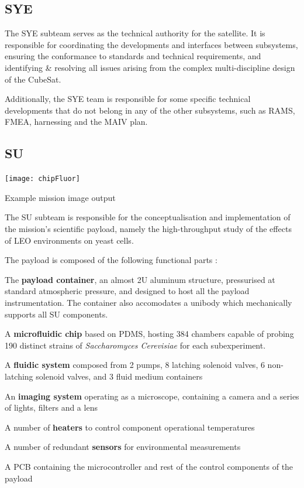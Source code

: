 \documentclass[a4paper,nobib]{tufte-book}
\begin{document}
\subsection{\acf{SYE}}

The \acl{SYE} subteam serves as the technical authority for the satellite. It is responsible for coordinating the developments and interfaces between subsystems, ensuring the conformance to standards and technical requirements, and identifying \& resolving all issues arising from the complex multi-discipline design of the CubeSat.

Additionally, the \ac{SYE} team is responsible for some specific technical developments that do not belong in any of the other subsystems, such as \ac{RAMS}, \ac{FMEA}, harnessing and the \acl{MAIV} plan.

\subsection{\acf{SU}}
\begin{marginfigure}
	\texttt{[image: chipFluor]}
	\caption[Example mission image output]{Example mission image output \parencite{DDJF_PL}}
	\label{fig:chip_fluor}
\end{marginfigure}

The \acl{SU} subteam is responsible for the conceptualisation and implementation of the mission's scientific payload, namely the high-throughput study of the effects of \ac{LEO} environments on yeast cells.

The payload is composed of the following functional parts \autocite{DDJF_PL}:
\begin{compactitem}
	\item The \textbf{payload container}, an almost 2U aluminum structure, pressurised at standard atmospheric pressure, and designed to host all the payload instrumentation. The container also accomodates a unibody which mechanically supports all \ac{SU} components.
	\item A \textbf{microfluidic chip} based on \ac{PDMS}, hosting 384 chambers capable of probing 190 distinct strains of \emph{Saccharomyces Cerevisiae} for each subexperiment.
	\item A \textbf{fluidic system} composed from 2 pumps, 8 latching solenoid valves, 6 non-latching solenoid valves, and 3 fluid medium containers
	\item An \textbf{imaging system} operating as a microscope, containing a camera and a series of lights, filters and a lens
	\item A number of \textbf{heaters} to control component operational temperatures
	\item A number of redundant \textbf{sensors} for environmental measurements
	\item A \ac{PCB} containing the microcontroller and rest of the control components of the payload
\end{compactitem}
\end{document}
